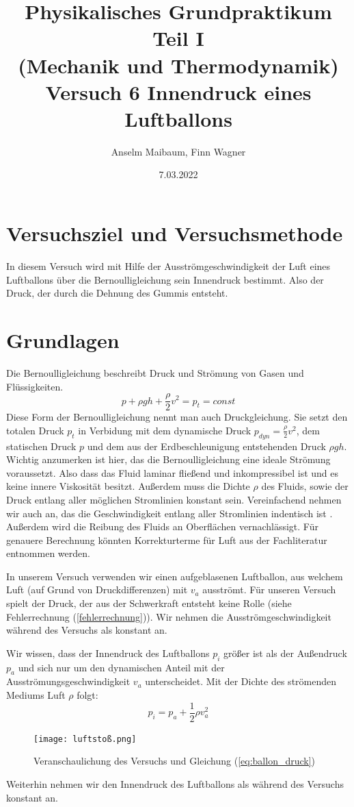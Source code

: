 \documentclass{article}
\date{7.03.2022}
\title{Physikalisches Grundpraktikum Teil I \\ (Mechanik und Thermodynamik) \\ Versuch 6 Innendruck eines Luftballons}
\author{Anselm Maibaum, Finn Wagner}
\begin{document}
    \maketitle

    \section{Versuchsziel und Versuchsmethode}
    In diesem Versuch wird mit Hilfe der Ausströmgeschwindigkeit der Luft eines Luftballons über die Bernoulligleichung sein Innendruck bestimmt.
    Also der Druck, der durch die Dehnung des Gummis entsteht.

    \section{Grundlagen}
    Die Bernoulligleichung beschreibt Druck und Strömung von Gasen und Flüssigkeiten.
    \begin{equation} \label{eq:bernoulli}
        p + \rho g h + \frac{\rho}{2} v^2 = p_t = const
    \end{equation}
    Diese Form der Bernoulligleichung nennt man auch Druckgleichung.
    Sie setzt den totalen Druck \( p_t \) in Verbidung mit dem dynamische Druck \(p_{dyn} = \frac{\rho}{2} v^2\), 
    dem statischen Druck \( p \) und dem aus der Erdbeschleunigung entstehenden Druck \( \rho g h  \).
    Wichtig anzumerken ist hier, das die Bernoulligleichung eine ideale Strömung voraussetzt.
    Also dass das Fluid laminar fließend und inkompressibel ist und es keine innere Viskosität besitzt.
    Außerdem muss die Dichte \( \rho \) des Fluids, sowie der Druck entlang aller möglichen Stromlinien konstant sein.
    Vereinfachend nehmen wir auch an, das die Geschwindigkeit entlang aller Stromlinien indentisch ist \cite{Aufgabenstellung}.
    Außerdem wird die Reibung des Fluids an Oberflächen vernachlässigt.
    Für genauere Berechnung könnten Korrekturterme für Luft aus der Fachliteratur entnommen werden.

    In unserem Versuch verwenden wir einen aufgeblasenen Luftballon, aus welchem Luft (auf Grund von Druckdifferenzen) mit \(v_a\) ausströmt.
    Für unseren Versuch spielt der Druck, der aus der Schwerkraft entsteht keine Rolle (siehe Fehlerrechnung (\ref{fehlerrechnung})).
    Wir nehmen die Ausströmgeschwindigkeit während des Versuchs als konstant an.
    
    Wir wissen, dass der Innendruck des Luftballons \(p_i\) größer ist als der Außendruck \(p_a\)
    und sich nur um den dynamischen Anteil mit der Ausströmungsgeschwindigkeit \(v_a\) unterscheidet.
    Mit der Dichte des strömenden Mediums Luft \( \rho \) folgt: 
    \begin{equation} \label{eq:ballon_druck}
        p_i = p_a + \frac{1}{2} \rho v_a^2
    \end{equation}
    \begin{figure}[h]\label{fig:luftstoss}
        \centering
        \texttt{[image: luftstoß.png]}
        \caption{Veranschaulichung des Versuchs und Gleichung (\ref{eq:ballon_druck})}
    \end{figure}
    Weiterhin nehmen wir den Innendruck des Luftballons als während des Versuchs konstant an.
\end{document}
